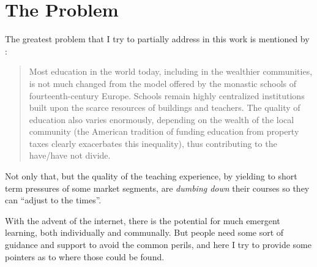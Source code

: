 \section{The Problem}

The greatest problem that I try to partially address in this work
is mentioned by \cite{futurism:kurzweil_singularity_is_near}:

\begin{quotation}
    Most education in the world today, including in the wealthier communities,
    is not much changed from the model offered by the monastic schools of
    fourteenth-century Europe. Schools remain highly centralized institutions
    built upon the scarce resources of buildings and teachers. The quality of
    education also varies enormously, depending on the wealth of the local
    community (the American tradition of funding education from property taxes
    clearly exacerbates this inequality), thus contributing to the have/have not
    divide.
\end{quotation}

Not only that, but the quality of the teaching experience, by yielding to short
term pressures of some market segments, are \emph{dumbing down} their courses so
they can ``adjust to the times''. \cite{education:spolsky__the_perils_of_java_schools}

With the advent of the internet, there is the potential for much emergent
learning, both individually and communally. But people need some sort of
guidance and support to avoid the common perils,
and here I try to provide some pointers as to where those could be found.




